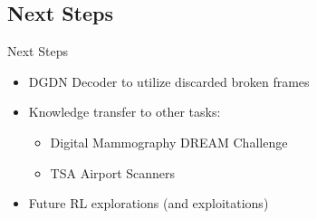 \documentclass[11pt]{beamer}
\begin{document}
	\subsection{Next Steps}
	\begin{frame}{Next Steps}
		\begin{itemize}
			\item DGDN Decoder to utilize discarded broken frames
			\item Knowledge transfer to other tasks: 
			\begin{itemize}
				\item Digital Mammography DREAM Challenge
				\item TSA Airport Scanners
			\end{itemize}
			\item Future RL explorations (and exploitations)
		\end{itemize}
	\end{frame}
	
\end{document}
